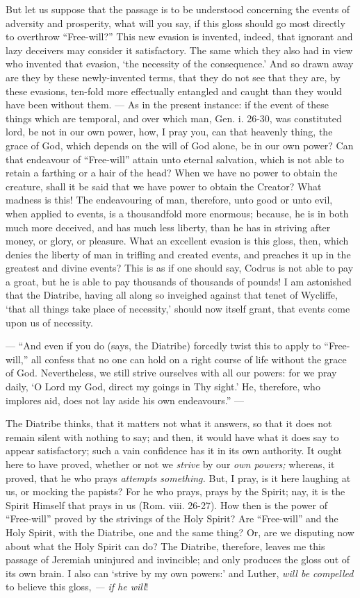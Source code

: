 But let us suppose that the passage is to be understood concerning the events of adversity and prosperity, what will you say, if this gloss should go most directly to overthrow “Free-will?” This new evasion is invented, indeed, that ignorant and lazy deceivers may consider it satisfactory. The same which they also had in view who invented that evasion, ‘the necessity of the consequence.’ And so drawn away are they by these newly-invented terms, that they do not see that they are, by these evasions, ten-fold more effectually entangled and caught than they would have been without them. — As in the present instance: if the event of these things which are temporal, and over which man, Gen. i. 26-30, was constituted lord, be not in our own power, how, I pray you, can that heavenly thing, the grace of God, which depends on the will of God alone, be in our own power? Can that endeavour of “Free-will” attain unto eternal salvation, which is not able to retain a farthing or a hair of the head? When we have no power to obtain the creature, shall it be said that we have power to obtain the Creator? What madness is this! The endeavouring of man, therefore, unto good or unto evil, when applied to events, is a thousandfold more enormous; because, he is in both much more deceived, and has much less liberty, than he has in striving after money, or glory, or pleasure. What an excellent evasion is this gloss, then, which denies the liberty of man in trifling and created events, and preaches it up in the greatest and divine events? This is as if one should say, Codrus is not able to pay a groat, but he is able to pay thousands of thousands of pounds! I am astonished that the Diatribe, having all along so inveighed against that tenet of Wycliffe, ‘that all things take place of necessity,’ should now itself grant, that events come upon us of necessity.

— “And even if you do (says, the Diatribe) forcedly twist this to apply to “Free-will,” all confess that no one can hold on a right course of life without the grace of God. Nevertheless, we still strive ourselves with all our powers: for we pray daily, ‘O Lord my God, direct my goings in Thy sight.’ He, therefore, who implores aid, does not lay aside his own endeavours.” —

The Diatribe thinks, that it matters not what it answers, so that it does not remain silent with nothing to say; and then, it would have what it does say to appear satisfactory; such a vain confidence has it in its own authority. It ought here to have proved, whether or not we \emph{strive} by our \emph{own powers; }whereas, it proved, that he who prays \emph{attempts something. }But, I pray, is it here laughing at us, or mocking the papists? For he who prays, prays by the Spirit; nay, it is the Spirit Himself that prays in us (Rom. viii. 26-27). How then is the power of “Free-will” proved by the strivings of the Holy Spirit? Are “Free-will” and the Holy Spirit, with the Diatribe, one and the same thing? Or, are we disputing now about what the Holy Spirit can do? The Diatribe, therefore, leaves me this passage of Jeremiah uninjured and invincible; and only produces the gloss out of its own brain. I also can ‘strive by my own powers:’ and Luther, \emph{will be compelled }to believe this gloss,\emph{ — if he will}!

